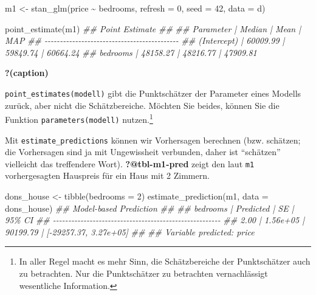 \documentclass[
  a4paper,
  DIV=11]{scrreprt}
\newenvironment{Shaded}{\begin{snugshade}}{\end{snugshade}}
\newcommand{\AttributeTok}[1]{\textcolor[rgb]{0.40,0.45,0.13}{#1}}
\newcommand{\DecValTok}[1]{\textcolor[rgb]{0.68,0.00,0.00}{#1}}
\newcommand{\DocumentationTok}[1]{\textcolor[rgb]{0.37,0.37,0.37}{\textit{#1}}}
\newcommand{\FunctionTok}[1]{\textcolor[rgb]{0.28,0.35,0.67}{#1}}
\newcommand{\NormalTok}[1]{\textcolor[rgb]{0.00,0.23,0.31}{#1}}
\newcommand{\OtherTok}[1]{\textcolor[rgb]{0.00,0.23,0.31}{#1}}
\newcommand{\SpecialCharTok}[1]{\textcolor[rgb]{0.37,0.37,0.37}{#1}}
\theoremstyle{definition}
\theoremstyle{remark}
\begin{document}
\begin{Shaded}
\begin{Highlighting}[]
\NormalTok{m1 }\OtherTok{\textless{}{-}} \FunctionTok{stan\_glm}\NormalTok{(price }\SpecialCharTok{\textasciitilde{}}\NormalTok{ bedrooms,}
               \AttributeTok{refresh =} \DecValTok{0}\NormalTok{,}
               \AttributeTok{seed =} \DecValTok{42}\NormalTok{,}
               \AttributeTok{data =}\NormalTok{ d)}

\FunctionTok{point\_estimate}\NormalTok{(m1)}
\DocumentationTok{\#\# Point Estimate}
\DocumentationTok{\#\# }
\DocumentationTok{\#\# Parameter   |   Median |     Mean |      MAP}
\DocumentationTok{\#\# {-}{-}{-}{-}{-}{-}{-}{-}{-}{-}{-}{-}{-}{-}{-}{-}{-}{-}{-}{-}{-}{-}{-}{-}{-}{-}{-}{-}{-}{-}{-}{-}{-}{-}{-}{-}{-}{-}{-}{-}{-}{-}{-}{-}}
\DocumentationTok{\#\# (Intercept) | 60009.99 | 59849.74 | 60664.24}
\DocumentationTok{\#\# bedrooms    | 48158.27 | 48216.77 | 47909.81}
\end{Highlighting}
\end{Shaded}

\begin{table}

\caption{\textbf{?(caption)}}

\end{table}

\texttt{point\_estimates(modell)} gibt die Punktschätzer der Parameter
eines Modells zurück, aber nicht die Schätzbereiche. Möchten Sie beides,
können Sie die Funktion \texttt{parameters(modell)} nutzen.\footnote{In
  aller Regel macht es mehr Sinn, die Schätzbereiche der Punktschätzer
  auch zu betrachten. Nur die Punktschätzer zu betrachten vernachlässigt
  wesentliche Information.}

Mit \texttt{estimate\_predictions} können wir Vorhersagen berechnen
(bzw. schätzen; die Vorhersagen sind ja mit Ungewissheit verbunden,
daher ist ``schätzen'' vielleicht das treffendere Wort).
\textbf{?@tbl-m1-pred} zeigt den laut \texttt{m1} vorhergesagten
Hauspreis für ein Haus mit 2 Zimmern.

\begin{Shaded}
\begin{Highlighting}[]
\NormalTok{dons\_house }\OtherTok{\textless{}{-}} \FunctionTok{tibble}\NormalTok{(}\AttributeTok{bedrooms =} \DecValTok{2}\NormalTok{)}
\FunctionTok{estimate\_prediction}\NormalTok{(m1, }\AttributeTok{data =}\NormalTok{ dons\_house)}
\DocumentationTok{\#\# Model{-}based Prediction}
\DocumentationTok{\#\# }
\DocumentationTok{\#\# bedrooms | Predicted |       SE |                95\% CI}
\DocumentationTok{\#\# {-}{-}{-}{-}{-}{-}{-}{-}{-}{-}{-}{-}{-}{-}{-}{-}{-}{-}{-}{-}{-}{-}{-}{-}{-}{-}{-}{-}{-}{-}{-}{-}{-}{-}{-}{-}{-}{-}{-}{-}{-}{-}{-}{-}{-}{-}{-}{-}{-}{-}{-}{-}{-}{-}{-}}
\DocumentationTok{\#\# 2.00     |  1.56e+05 | 90199.79 | [{-}29257.37, 3.27e+05]}
\DocumentationTok{\#\# }
\DocumentationTok{\#\# Variable predicted: price}
\end{Highlighting}
\end{Shaded}
\end{document}
